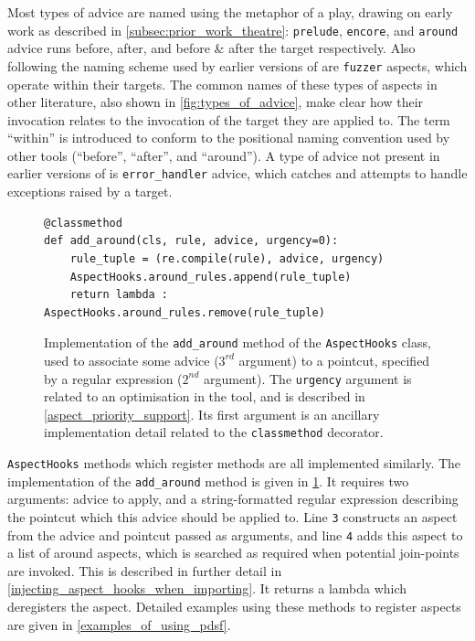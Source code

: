 Most types of advice are named using the metaphor of a play, drawing on early
\theatreag{} work as described in \cref{subsec:prior_work_theatre}:
\lstinline{prelude}, \lstinline{encore}, and \lstinline{around} advice runs
before, after, and before \& after the target respectively. Also following the
naming scheme used by earlier versions of \pdsf{} are \lstinline{fuzzer}
aspects, which operate within their targets. The common names of these types of
aspects in other literature, also shown in \cref{fig:types_of_advice}, make
clear how their invocation relates to the invocation of the target they are
applied to. The term ``within'' is introduced to conform to the positional
naming convention used by other tools (``before'', ``after'', and ``around''). A
type of advice not present in earlier versions of \pdsf{} is
\lstinline{error_handler} advice, which catches and attempts to handle
exceptions raised by a target.

\begin{figure}
    \begin{lstlisting}[style=footnotesize_python]
@classmethod
def add_around(cls, rule, advice, urgency=0):
    rule_tuple = (re.compile(rule), advice, urgency)
    AspectHooks.around_rules.append(rule_tuple)
    return lambda : AspectHooks.around_rules.remove(rule_tuple)
    \end{lstlisting}
    \caption{Implementation of the \lstinline{add_around} method of the
    \lstinline{AspectHooks} class, used to associate some advice ($3^{rd}$
    argument) to a pointcut, specified by a regular expression ($2^{nd}$
    argument). The \lstinline{urgency} argument is related to an optimisation
    in the tool, and is described in \cref{aspect_priority_support}. Its first
    argument is an ancillary implementation detail related to the
    \lstinline{classmethod} decorator.}
    \label{fig:add_around_impl}
\end{figure}


\lstinline{AspectHooks} methods which register methods are all implemented
similarly. The implementation of the \lstinline{add_around} method is given in
\cref{fig:add_around_impl}. It requires two arguments: advice to apply, and a
string-formatted regular expression describing the pointcut which this advice
should be applied to. Line \texttt{3} constructs an aspect from the advice and
pointcut passed as arguments, and line \texttt{4} adds this aspect to a list of
around aspects, which is searched as required when potential join-points are
invoked. This is described in further detail in
\cref{injecting_aspect_hooks_when_importing}. It returns a lambda which
deregisters the aspect. Detailed examples using these methods to register
aspects are given in \cref{examples_of_using_pdsf}.


